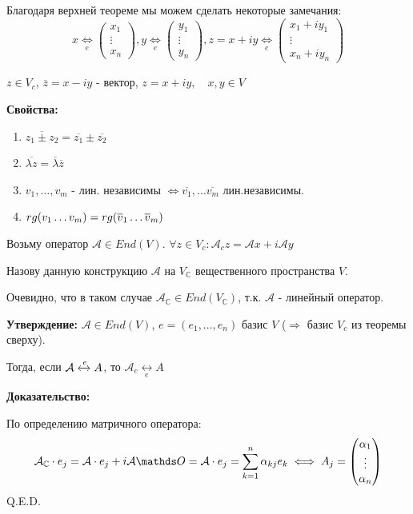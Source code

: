 Благодаря верхней теореме мы можем сделать некоторые замечания:
$$x \underset{e} \iff \begin{pmatrix}
    x_1\\
    \vdots \\
    x_n
\end{pmatrix},y \underset{e} \iff \begin{pmatrix}
    y_1\\
    \vdots \\
    y_n
\end{pmatrix}, z=x+iy \underset{e} \iff \begin{pmatrix}
    x_1 +iy_1\\
    \vdots \\
    x_n+iy_n
\end{pmatrix}$$


 $z \in V_c$, $\overline{z}=x-iy$ -  вектор, $z=x+iy, \quad x,y \in V$

\textbf{Свойства:}
\begin{enumerate}
    \item $\overline{z_1 \pm z_2} = \overline{z_1}  \pm \overline{z_2}$
    \item $\overline{\lambda z} = \overline{\lambda} \overline{z}$
    \item $v_1,\ldots,v_m$ - лин. независимы $\Leftrightarrow \overline{v_1}, \ldots \overline{v_m}$ лин.независимы.
    \item $rg (v_1\dots v_m) = rg (\overline{v}_1\dots \overline{v}_m)$
\end{enumerate}

 Возьму оператор $\mathcal{A} \in End(V)$.  $\forall z \in V_c: \mathcal{A}_cz =\mathcal{A}x + i \mathcal{A}y$ 

Назову данную конструкцию  $\mathcal{A}$ на $V_{\mathbb{C}}$ вещественного пространства $V$.

Очевидно, что в таком случае $\mathcal{A}_\mathbb{C} \in End(V_{\mathbb{C}})$, т.к. $\mathcal{A}$ - линейный оператор.

\textbf{Утверждение:} $\mathcal{A} \in End(V)$, $e = (e_1,\ldots, e_n) $ базис $V$ ($\Rightarrow$ базис $V_c$ из теоремы сверху). 

Тогда, если $\mathcal{A} \xleftrightarrow{e}A$, то $ \mathcal{A}_c \underset{e} \leftrightarrow A$

\textbf{Доказательство:}

По определению матричного оператора:
$$\mathcal{A}_{\mathbb{C}}  \cdot e_j = \mathcal{A}  \cdot e_j + i\mathcal{A} \zero = \mathcal{A} \cdot e_j =\sum\limits_{k=1}^n \alpha_{kj}e_k \iff A_j = \begin{pmatrix}
    \alpha_1\\
    \vdots \\
    \alpha_n
\end{pmatrix}$$
\hfill Q.E.D.


